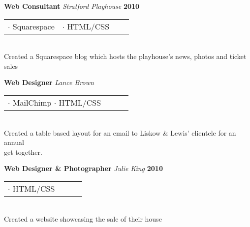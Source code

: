 \documentclass[margin,line]{res}
\begin{document}
{\begin{resume}

    {\bf Web Consultant} {\em Stratford Playhouse} \hfill {\bf 2010} \
    \\
    \begin{tabular}{l l l l}
      $\cdot$ Squarespace  & $\cdot$ HTML/CSS
    \end{tabular}
    \\
    \hspace*{.14pt} 
    Created a Squarespace blog which hosts the playhouse's news,
    photos and ticket sales
    \vspace{-.13in}
    

    {\bf Web Designer} {\em Lance Brown} \hfill %
    \\
    \begin{tabular}{l l l l}
        $\cdot$ MailChimp $\cdot$ HTML/CSS
    \end{tabular}
    \\
    \hspace*{.14pt} 
    Created a table based layout for an email to Liskow \& Lewis'
    clientele for an annual \\ get together.
    \vspace{-.13in}


    {\bf Web Designer \& Photographer} {\em Julie King} \hfill {\bf 2010} \ 
    \\
    \begin{tabular}{l l l l}
      $\cdot$ HTML/CSS &
    \end{tabular}
    \\
    \hspace*{.14pt} 
    Created a website showcasing the sale of their house


\end{resume}}
\end{document}

